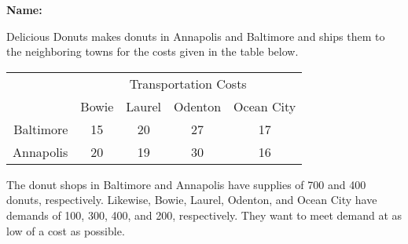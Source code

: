 \documentclass[letterpaper,oneside,12pt]{article}%
\begin{document}
\noindent{}

\vspace{3mm} \hspace{\fill} \textbf{Name: \underline{\hspace{6cm}}}

Delicious Donuts makes donuts in Annapolis and Baltimore and ships them to the neighboring towns for the costs given in the table below.

\begin{center}
\begin{tabular}{r|cccc}
& \multicolumn{4}{c}{Transportation Costs} \\
             & Bowie & Laurel & Odenton & Ocean City \\
\hline
Baltimore    & 15      & 20     & 27 &  17    \\
Annapolis    & 20      & 19     & 30 &  16    \\
\hline
\end{tabular}
\end{center}

The donut shops in Baltimore and Annapolis have supplies of 700 and 400 donuts, respectively. Likewise, Bowie, Laurel, Odenton, and Ocean City have demands of 100, 300, 400, and 200, respectively. They want to meet demand at as low of a cost as possible.
\end{document}
